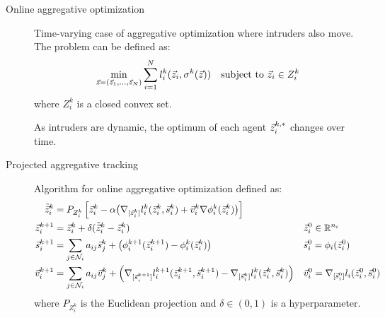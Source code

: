 \begin{description}
    \item[Online aggregative optimization] 
        Time-varying case of aggregative optimization where intruders also move. The problem can be defined as:
        \[
            \min_{{\vec{z}}=({\vec{z}}_1, \dots, {\vec{z}}_N)} \sum_{i=1}^{N} l_i^k({\vec{z}}_i, \sigma^k({\vec{z}})) \quad\text{subject to ${\vec{z}}_i \in Z_i^k$}
        \]
        where $Z_i^k$ is a closed convex set.

        \begin{remark}
            As intruders are dynamic, the optimum of each agent ${\vec{z}}_i^{k,*}$ changes over time.
        \end{remark}

    \item[Projected aggregative tracking] 
        Algorithm for online aggregative optimization defined as:
        \[
            \begin{aligned}
                \tilde{{\vec{z}}}_i^k &= P_{Z_i^k} \left[ {\vec{z}}_i^k - \alpha \big( \nabla_{[{\vec{z}}_i^k]} l_i^k({\vec{z}}_i^k, {\vec{s}}_i^k) + {\vec{v}}_i^k \nabla\phi_i^k({\vec{z}}_i^k) \big) \right] \\
                {\vec{z}}_i^{k+1} &= {\vec{z}}_i^k + \delta(\tilde{{\vec{z}}}_i^k - {\vec{z}}_i^k) && {\vec{z}}_i^0 \in \mathbb{R}^{n_i} \\
                {\vec{s}}_i^{k+1} &= \sum_{j \in \mathcal{N}_i} a_{ij} {\vec{s}}_j^k + \left( \phi^{k+1}_i({\vec{z}}_i^{k+1}) - \phi^{k}_i({\vec{z}}_i^k) \right) && {\vec{s}}_i^0 = \phi_i({\vec{z}}_i^0) \\
                {\vec{v}}_i^{k+1} &= \sum_{j \in \mathcal{N}_i} a_{ij} {\vec{v}}_j^k + \left( \nabla_{[{\vec{s}}_i^{k+1}]} l_i^{k+1}({\vec{z}}_i^{k+1}, {\vec{s}}_i^{k+1}) - \nabla_{[{\vec{s}}_i^k]} l_i^k({\vec{z}}_i^k, {\vec{s}}_i^k) \right) && {\vec{v}}_i^0 = \nabla_{[{\vec{s}}_i^0]} l_i({\vec{z}}_i^0, {\vec{s}}_i^0) \\
            \end{aligned}
        \]
        where $P_{Z_i^k}$ is the Euclidean projection and $\delta \in (0, 1)$ is a hyperparameter.
\end{description}